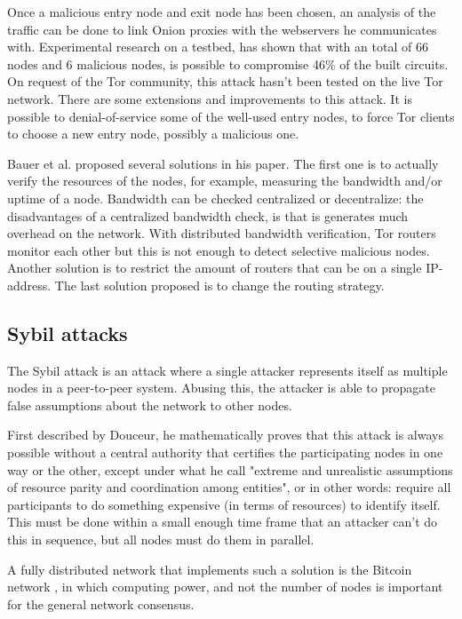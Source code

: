 \documentclass{article}
\begin{document}
		Once a malicious entry node and exit node has been chosen, an analysis of the traffic can be done to link Onion proxies with the webservers he communicates with. Experimental research on a testbed, has shown that with an total of 66 nodes and 6 malicious nodes, is possible to compromise 46\% of the built circuits. On request of the Tor community, this attack hasn't been tested on the live Tor network. There are some extensions and improvements to this attack. It is possible to denial-of-service some of the well-used entry nodes, to force Tor clients to choose a new entry node, possibly a malicious one.

		Bauer et al. proposed several solutions in his paper. The first one is to actually verify the resources of the nodes, for example, measuring the bandwidth and/or uptime of a node. Bandwidth can be checked centralized or decentralize: the disadvantages of a centralized bandwidth check, is that is generates much overhead on the network. With distributed bandwidth verification, Tor routers monitor each other but this is not enough to detect selective malicious nodes. Another solution is to restrict the amount of routers that can be on a single IP-address. The last solution proposed is to change the routing strategy.	
		
	\subsection{Sybil attacks}
		The Sybil attack is an attack where a single attacker represents itself as multiple nodes in a peer-to-peer system. Abusing this, the attacker is able to propagate false assumptions about the network to other nodes.
		
		First described by Douceur, he \cite{douceur2002sybil} mathematically proves that this attack is always possible without a central authority that certifies the participating nodes in one way or the other, except under what he call "extreme and unrealistic assumptions of resource parity and coordination among entities", or in other words: require all participants to do something expensive (in terms of resources) to identify itself. This must be done within a small enough time frame that an attacker can't do this in sequence, but all nodes must do them in parallel.
		
		A fully distributed network that implements such a solution is the Bitcoin network \cite{nakamoto2008bitcoin}, in which computing power, and not the number of nodes is important for the general network consensus.
				
\end{document}
